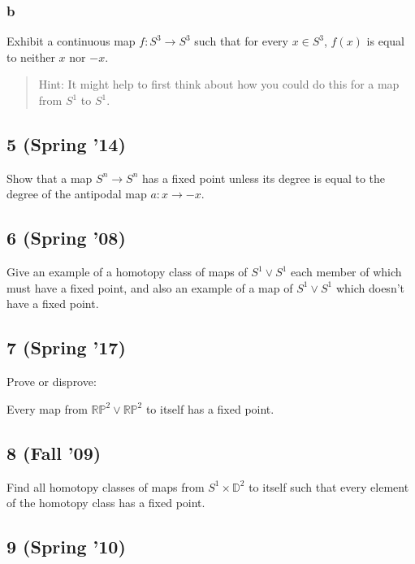 \hypertarget{b-5}{%
\subsubsection{b}\label{b-5}}

Exhibit a continuous map \(f : S^3 \to S^3\) such that for every
\(x \in S^3\), \(f (x)\) is equal to neither \(x\) nor \(-x\).

\begin{quote}
Hint: It might help to first think about how you could do this for a map
from \(S^1\) to \(S^1\).
\end{quote}

\hypertarget{spring-14-3}{%
\subsection{5 (Spring '14)}\label{spring-14-3}}

Show that a map \(S^n \to S^n\) has a fixed point unless its degree is
equal to the degree of the antipodal map \(a : x \to -x\).

\hypertarget{spring-08-4}{%
\subsection{6 (Spring '08)}\label{spring-08-4}}

Give an example of a homotopy class of maps of \(S^1 \lor S^1\) each
member of which must have a fixed point, and also an example of a map of
\(S^1 \lor S^1\) which doesn't have a fixed point.

\hypertarget{spring-17-3}{%
\subsection{7 (Spring '17)}\label{spring-17-3}}

Prove or disprove:

Every map from \({\mathbb{RP}}^2 \lor {\mathbb{RP}}^2\) to itself has a
fixed point.

\hypertarget{fall-09-1}{%
\subsection{8 (Fall '09)}\label{fall-09-1}}

Find all homotopy classes of maps from \(S^1 \times {\mathbb{D}}^2\) to
itself such that every element of the homotopy class has a fixed point.

\hypertarget{spring-10-2}{%
\subsection{9 (Spring '10)}\label{spring-10-2}}

